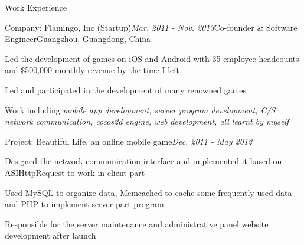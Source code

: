 \documentclass{resume} %
\begin{document}
\begin{rSection}{Work Experience}

\begin{rSubsection}{Company: Flamingo, Inc (Startup)}{\em Mar. 2011 - Nov. 2013}{Co-founder \& Software Engineer}{Guangzhou, Guangdong, China}
\item Led the development of games on iOS and Android with 35 employee headcounts and \$500,000 monthly revenue by the time I left
\item Led and participated in the development of many renowned games
\item Work including \textit{mobile app development, server program development, C/S network communication, cocos2d engine, web development, all learnt by myself}
\end{rSubsection}


\begin{rSubsection}{Project: Beautiful Life, an online mobile game}{\em Dec. 2011 - May 2012}{}{}
\item Designed the network communication interface and implemented it based on ASIHttpRequest to work in client part
\item Used MySQL to organize data, Memcached to cache some frequently-used data and PHP to implement server part program
\item Responsible for the server maintenance and administrative panel website development after launch
\end{rSubsection}


\end{rSection}





\end{document}

